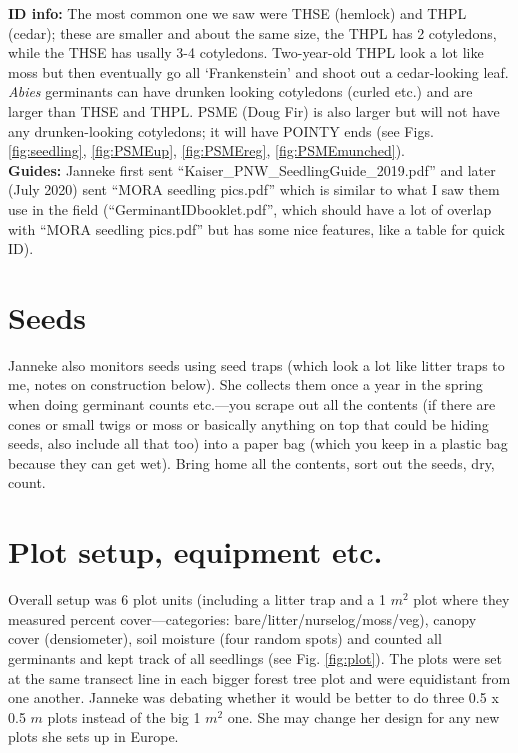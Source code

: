 \documentclass[11pt,letter]{article}
\begin{document}
{\bf ID info:} The most common one we saw were THSE (hemlock) and THPL (cedar); these are smaller and about the same size, the THPL has 2 cotyledons, while the THSE has usally 3-4 cotyledons. Two-year-old THPL look a lot like moss but then eventually go all `Frankenstein' and shoot out a cedar-looking leaf. \emph{Abies} germinants can have drunken looking cotyledons (curled etc.) and are larger than THSE and THPL. PSME (Doug Fir) is also larger but will not have any drunken-looking cotyledons; it will have POINTY ends (see Figs. \ref{fig:seedling}, \ref{fig:PSMEup}, \ref{fig:PSMEreg}, \ref{fig:PSMEmunched}). \\

{\bf Guides:} Janneke first sent ``Kaiser\_PNW\_SeedlingGuide\_2019.pdf'' and later (July 2020) sent ``MORA seedling pics.pdf'' which is similar to what I saw them use in the field (``GerminantIDbooklet.pdf'', which should have a lot of overlap with ``MORA seedling pics.pdf''  but has some nice features, like a table for quick ID). 

\section{Seeds}

Janneke also monitors seeds using seed traps (which look a lot like litter traps to me, notes on construction below). She collects them once a year in the spring when doing germinant counts etc.---you scrape out all the contents (if there are cones or small twigs or moss or basically anything on top that could be hiding seeds, also include all that too) into a paper bag (which you keep in a plastic bag because they can get wet). Bring home all the contents, sort out the seeds, dry, count.

\section{Plot setup, equipment etc.}
Overall setup was 6 plot units (including a litter trap and a 1 $m^2$ plot where they measured percent cover---categories: bare/litter/nurselog/moss/veg), canopy cover (densiometer), soil moisture (four random spots) and counted all germinants and kept track of all seedlings (see Fig. \ref{fig:plot}). The plots were set at the same transect line in each bigger forest tree plot and were equidistant from one another. Janneke was debating whether it would be better to do three 0.5 x 0.5 $m$ plots instead of the big 1 $m^2$ one. She may change her design for any new plots she sets up in Europe.\\
\end{document}
